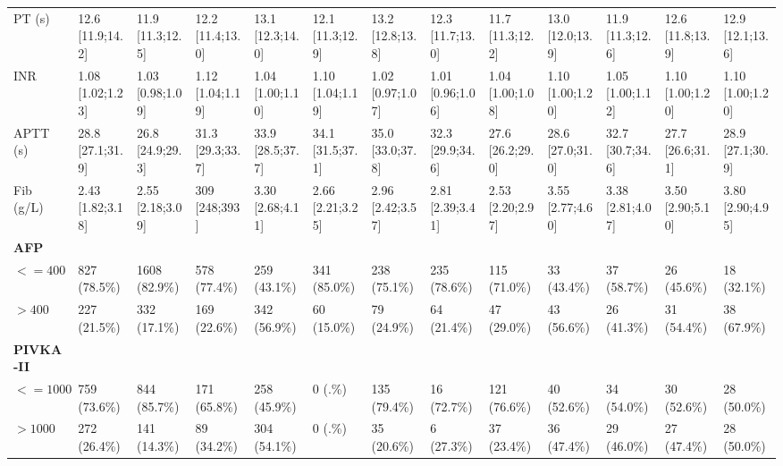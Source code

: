 \documentclass{article}
\begin{document}
\begin{landscape}
\begin{tiny}
\begin{tabularx}{\linewidth}{p{2.0cm}|X|X|X|X|X|X|X|X|X|X|X|X}
\rowcolor{gray!10}
PT (s) & 12.6 [11.9;14.2] & 11.9 [11.3;12.5] & 12.2 [11.4;13.0] & 13.1 [12.3;14.0] & 12.1 [11.3;12.9] & 13.2 [12.8;13.8] & 12.3 [11.7;13.0] & 11.7 [11.3;12.2] & 13.0 [12.0;13.9] & 11.9 [11.3;12.6] & 12.6 [11.8;13.9] & 12.9 [12.1;13.6] \\
\rowcolor{gray!10}
INR & 1.08 [1.02;1.23] & 1.03 [0.98;1.09] & 1.12 [1.04;1.19] & 1.04 [1.00;1.10] & 1.10 [1.04;1.19] & 1.02 [0.97;1.07] & 1.01 [0.96;1.06] & 1.04 [1.00;1.08] & 1.10 [1.00;1.20] & 1.05 [1.00;1.12] & 1.10 [1.00;1.20] & 1.10 [1.00;1.20] \\
\rowcolor{gray!10}
APTT (s) & 28.8 [27.1;31.9] & 26.8 [24.9;29.3] & 31.3 [29.3;33.7] & 33.9 [28.5;37.7] & 34.1 [31.5;37.1] & 35.0 [33.0;37.8] & 32.3 [29.9;34.6] & 27.6 [26.2;29.0] & 28.6 [27.0;31.0] & 32.7 [30.7;34.6] & 27.7 [26.6;31.1] & 28.9 [27.1;30.9] \\
\rowcolor{gray!10}
Fib (g/L) & 2.43 [1.82;3.18] & 2.55 [2.18;3.09] &  309 [248;393]   & 3.30 [2.68;4.11] & 2.66 [2.21;3.25] & 2.96 [2.42;3.57] & 2.81 [2.39;3.41] & 2.53 [2.20;2.97] & 3.55 [2.77;4.60] & 3.38 [2.81;4.07] & 3.50 [2.90;5.10] & 3.80 [2.90;4.95] \\
\rowcolor{gray!30}
\textbf{AFP }  &  &  &  &  &  &  &  &  &  &  &  &  \\
\rowcolor{gray!10}
    $<=400$ &   827 (78.5\%)    &   1608 (82.9\%)   &   578 (77.4\%)    &   259 (43.1\%)    &   341 (85.0\%)    &   238 (75.1\%)    &   235 (78.6\%)    &   115 (71.0\%)    &    33 (43.4\%)    &    37 (58.7\%)    &    26 (45.6\%)    &    18 (32.1\%)    \\
\rowcolor{gray!10}
    $>400$ &   227 (21.5\%)    &   332 (17.1\%)    &   169 (22.6\%)    &   342 (56.9\%)    &    60 (15.0\%)    &    79 (24.9\%)    &    64 (21.4\%)    &    47 (29.0\%)    &    43 (56.6\%)    &    26 (41.3\%)    &    31 (54.4\%)    &    38 (67.9\%)    \\
\rowcolor{gray!30}
\textbf{PIVKA-II }  &  &  &  &  &  &  &  &  &  &  &  &  \\
\rowcolor{gray!10}
    $<=1000$ &   759 (73.6\%)    &   844 (85.7\%)    &   171 (65.8\%)    &   258 (45.9\%)    &      0 (.\%)      &   135 (79.4\%)    &    16 (72.7\%)    &   121 (76.6\%)    &    40 (52.6\%)    &    34 (54.0\%)    &    30 (52.6\%)    &    28 (50.0\%)    \\
\rowcolor{gray!10}
    $>1000$ &   272 (26.4\%)    &   141 (14.3\%)    &    89 (34.2\%)    &   304 (54.1\%)    &      0 (.\%)      &    35 (20.6\%)    &    6 (27.3\%)     &    37 (23.4\%)    &    36 (47.4\%)    &    29 (46.0\%)    &    27 (47.4\%)    &    28 (50.0\%)    \\

\end{tabularx}
\end{tiny}
\end{landscape}
\end{document}
